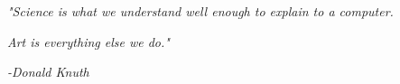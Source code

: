 \clearpage
{}

\begin{center}
\vspace*{9cm}
\textit{"Science is what we understand well enough to explain to a computer.}

\textit{Art is everything else we do."}
\end{center}
\par
\hspace*{7cm}
\textit{-Donald Knuth}

